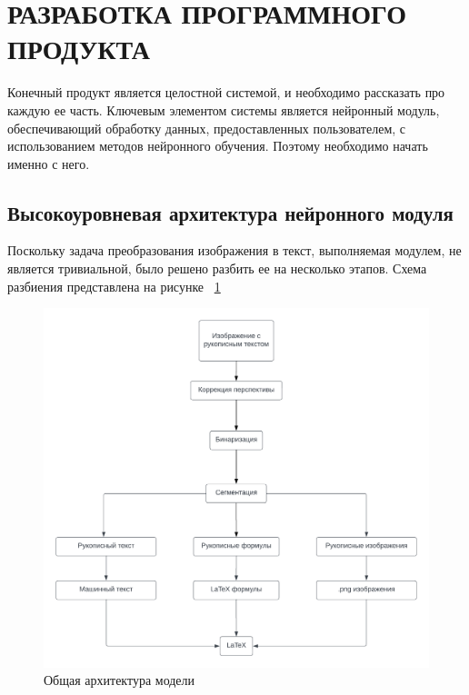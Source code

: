 \section{РАЗРАБОТКА ПРОГРАММНОГО ПРОДУКТА}

Конечный продукт является целостной системой, и необходимо рассказать про каждую ее часть. Ключевым элементом системы является нейронный модуль,
обеспечивающий обработку данных, предоставленных пользователем, с использованием методов нейронного обучения. Поэтому необходимо начать именно с него.
\subsection{Высокоуровневая архитектура нейронного модуля}

Поскольку задача преобразования изображения в текст, выполняемая модулем, не является тривиальной, было решено разбить ее на несколько этапов. 
Схема разбиения представлена на рисунке ~\ref{neuro_model}

\begin{figure}
\includegraphics[scale=0.75]{img/Blank_diagram.png}
\caption{Общая архитектура модели}
\label{neuro_model}
\end{figure}

